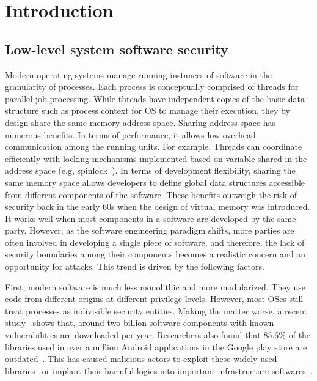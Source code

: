 \section{Introduction}
\subsection{Low-level system software security}
Modern operating systems manage running instances of software in the granularity of processes. 
Each process is conceptually comprised of threads for parallel job processing. While threads have 
independent copies of the basic data structure such as process context for OS to manage their execution, they by design share the same memory address space. Sharing address space has numerous benefits. In terms of performance, it allows low-overhead communication among the running units. For example, Threads can coordinate efficiently with locking mechanisms implemented based on variable shared in the address space (e.g, spinlock~\cite{spinlock}). In terms of development flexibility, sharing the same memory space allows developers to define global data structures accessible from different components of the software.
These benefits outweigh the risk of security back in the early 60s when the design of virtual memory was introduced. It works well when most components in a software are developed by the same party. However, as the software engineering paradigm shifts, more parties are often involved in developing a single piece of software, and therefore, the lack of security boundaries among their components becomes a realistic concern and an opportunity for attacks. This trend is driven by the following factors.

First, modern software is much less monolithic and more modularized. They use code from different origins at different privilege levels. 
However, most OSes still treat processes as indivisible security entities. Making the matter worse, a recent study~\cite{enigmasurvey} shows that, around two billion software components with known vulnerabilities are downloaded per year. 
Researchers also found that 85.6\% of the libraries used in over a million Android applications in the Google play store are outdated~\cite{3rdpartysurvey}. 
This has caused malicious actors to exploit these widely used libraries~\cite{taomikesdk,baidusdk,fbsdk,dropboxsdk} or implant their harmful logics into important infrastructure softwares~\cite{xcodeghost}. 

